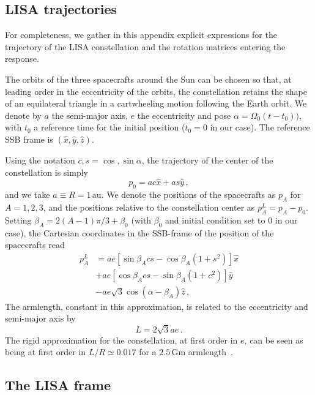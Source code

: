 \documentclass[aps,showpacs,twocolumn,prd,superscriptaddress,nofootinbib]{revtex4-1}
\newcommand{\be}{\begin{equation}}
\newcommand{\ee}{\end{equation}}
\newcommand{\bsub}{\begin{subequations}}
\newcommand{\esub}{\end{subequations}}
\newcommand{\nn}{\nonumber}
\begin{document}
\subsection{LISA trajectories}
\label{sec:lisatraj}

For completeness, we gather in this appendix explicit expressions for the trajectory of the LISA constellation and the rotation matrices entering the response.

The orbits of the three spacecrafts around the Sun can be chosen so that, at leading order in the eccentricity of the orbits, the constellation retains the shape of an equilateral triangle in a cartwheeling motion following the Earth orbit. We denote by $a$ the semi-major axis, $e$ the eccentricity and pose $\alpha = \Omega_{0} (t-t_{0}))$, with $t_{0}$ a reference time for the initial position ($t_{0} = 0$ in our case). The reference SSB frame is $(\hat{x}, \hat{y}, \hat{z})$.

Using the notation $c,s = \cos, \sin \alpha$, the trajectory of the center of the constellation is simply
\be
	p_{0} = ac \hat{x} + as \hat{y} \,,
\ee
and we take $a\equiv R = 1 \, \mathrm{au}$. We denote the positions of the spacecrafts as $p_{A}$ for $A=1,2,3$, and the positions relative to the constellation center as $p_{A}^{L} = p_{A} - p_{0}$. Setting $\beta_{A} = 2(A-1)\pi/3 + \beta_{0}$ (with $\beta_{0}$ and initial condition set to 0 in our case), the Cartesian coordinates in the SSB-frame of the position of the spacecrafts read~\cite{}
\bsub
\begin{align}
	p_{A}^{L} &= a e \left[ \sin \beta_{A} c s - \cos\beta_{A} \left( 1 + s^{2} \right) \right] \hat{x} \nn\\
	& + a e \left[ \cos \beta_{A} c s - \sin\beta_{A} \left( 1 + c^{2} \right) \right] \hat{y} \nn\\
	& - a e \sqrt{3} \cos(\alpha - \beta_{A}) \hat{z} \,,
\end{align}
\esub
The armlength, constant in this approximation, is related to the eccentricity and semi-major axis by
\be
	L = 2\sqrt{3} a e \,.
\ee
The rigid approximation for the constellation, at first order in $e$, can be seen as being at first order in $L/R \simeq 0.017$ for a $2.5 \, \mathrm{Gm}$ armlength~\cite{}.


\subsection{The LISA frame}
\label{sec:LISAframe}
\end{document}
